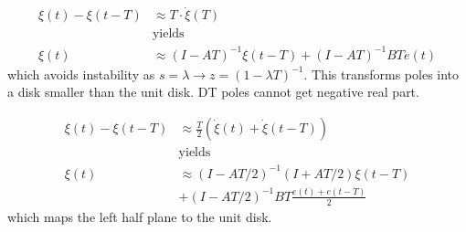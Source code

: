 \noindent\begin{align*}
    \xi(t)-\xi(t-T) & \approx T\cdot\dot{\xi}(T)                   \\
                    & \text{yields}                                \\
    \xi(t)          & \approx(I-AT)^{-1}\xi(t-T)+(I-AT)^{-1}BTe(t)
\end{align*}
which avoids instability as $s=\lambda \rightarrow z=(1-\lambda T)^{-1}$. This transforms poles into a disk smaller than the unit disk. DT poles cannot get negative real part.\\

\noindent\begin{align*}
    \xi(t)-\xi(t-T) & \approx \frac T2\left(\dot{\xi}(t)+\dot{\xi}(t-T)\right) \\
                    & \text{yields}                                            \\
    \xi(t)          & \approx(I-AT/2)^{-1}(I+AT/2)\xi(t-T)                     \\
                    & +(I-AT/2)^{-1}BT\frac{e(t)+e(t-T)}2
\end{align*}
which maps the left half plane to the unit disk.